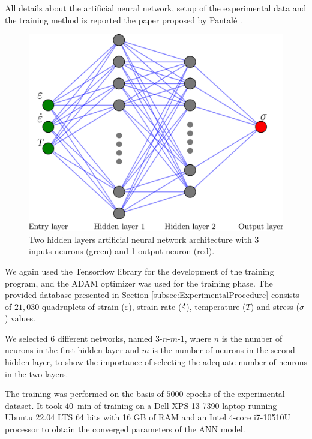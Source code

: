 \documentclass[metals,article,submit,pdftex,moreauthors]{Definitions/mdpi}
\DeclareRobustCommand{\mdot}[1]{\accentset{\mbox{\bfseries .}}{#1}}
\begin{document}
All details about the artificial neural network, setup of the experimental data and the training method is reported the paper proposed by Pantalé \cite{Pantale-2023}.

\begin{figure}[H]
\centering
\includegraphics[width=0.7\columnwidth]{Figures/ANN-scheme-2HL}
\caption{Two hidden layers artificial neural network architecture with 3 inputs neurons (green) and 1 output neuron (red).}
\label{fig:ANN-2HL}
\end{figure}

We again used the Tensorflow library for the development of the training program, and the ADAM optimizer was used for the training phase.
The provided database presented in Section \ref{subsec:ExperimentalProcedure} consists of $21,030$ quadruplets of strain ($\varepsilon$), strain rate ($\mdot\varepsilon$), temperature ($T$) and stress ($\sigma$) values.

We selected 6 different networks, named 3-$n$-$m$-1, where $n$ is the number of neurons in the first hidden layer and $m$ is the number of neurons in the second hidden layer, to show the importance of selecting the adequate number of neurons in the two layers.

The training was performed on the basis of $5000$ epochs of the experimental dataset.
It took $40$~min of training on a Dell XPS-13 7390 laptop running Ubuntu 22.04 LTS 64 bits with 16 GB of RAM and an Intel 4-core i7-10510U processor to obtain the converged parameters of the ANN model.
\end{document}
